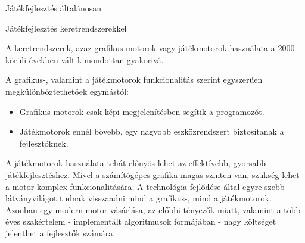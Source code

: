 \begin{MyChapter}{Játékfejlesztés általánosan}
	\begin{MySection}{Játékfejlesztés keretrendszerekkel}
		
		A keretrendszerek, azaz grafikus motorok vagy játékmotorok használata a 2000 körüli években vált kimondottan gyakorivá.
		
		A grafikus-, valamint a játékmotorok funkcionalitás szerint egyszerűen megkülönböztethetőek egymástól:
		\begin{itemize}
			\item Grafikus motorok csak képi megjelenítésben segítik a programozót.
			\item Játékmotorok ennél bővebb, egy nagyobb eszközrendszert biztosítanak a fejlesztőknek.
		\end{itemize}
		A játékmotorok használata tehát előnyös lehet az effektívebb, gyorsabb játékfejlesztéshez. Mivel a számítógépes grafika magas szinten van, szükség lehet a motor komplex funkcionalitására. A technológia fejlődése által egyre szebb látványvilágot tudnak visszaadni mind a grafikus-, mind a játékmotorok. Azonban egy modern motor vásárlása, az előbbi tényezők miatt, valamint a több éves szakértelem - implementált algoritmusok formájában - nagy költséget jelenthet a fejlesztők számára. 
		\end{MySection}
	
\end{MyChapter}
		


